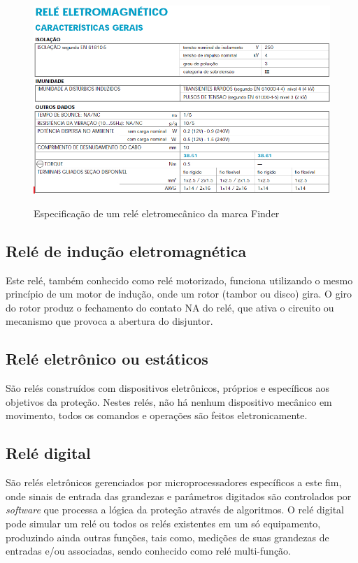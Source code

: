 \documentclass[a5paper]{ufsc-thesis}
\begin{document}
\begin{figure}[htb]
  \caption{Especificação de um relé eletromecânico da marca Finder}
  \centering
  \includegraphics[width=16cm]{eletromag.jpg}
  \label{fig:eletromag}
\end{figure}

\subsection{Relé de indução eletromagnética}
Este relé, também conhecido como relé motorizado, funciona utilizando o mesmo princípio de um motor de indução, onde um rotor (tambor ou disco) gira. O giro do rotor produz o fechamento do contato NA do relé, que ativa o circuito ou mecanismo que provoca a abertura do disjuntor.\par

\subsection{Relé eletrônico ou estáticos}
São relés construídos com dispositivos eletrônicos, próprios e específicos aos objetivos da proteção. Nestes relés, não há nenhum dispositivo mecânico em movimento, todos os comandos e operações são feitos eletronicamente.\par

\subsection{Relé digital}
São relés eletrônicos gerenciados por microprocessadores específicos a este fim, onde sinais de entrada das grandezas e parâmetros digitados são controlados por \textit{software} que processa a lógica da proteção através de algoritmos. O relé digital pode simular um relé ou todos os relés existentes em um só equipamento, produzindo ainda outras funções, tais como, medições de suas grandezas de entradas e/ou associadas, sendo conhecido como relé multi-função.\par
\end{document}

